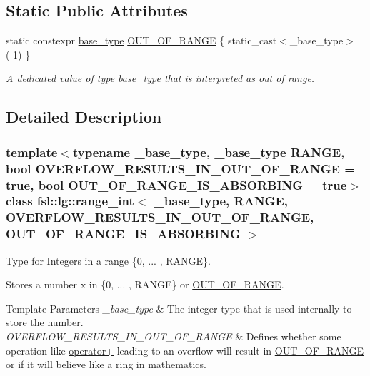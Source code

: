 \subsection*{Static Public Attributes}
\begin{DoxyCompactItemize}
\item 
\mbox{\label{classfsl_1_1lg_1_1range__int_ad2c724f2b6b690d1217d51ef4b712225}} 
static constexpr \mbox{\hyperlink{classfsl_1_1lg_1_1range__int_a901feb77897b3353d554f06d4d6a8f4a}{base\+\_\+type}} \mbox{\hyperlink{classfsl_1_1lg_1_1range__int_ad2c724f2b6b690d1217d51ef4b712225}{O\+U\+T\+\_\+\+O\+F\+\_\+\+R\+A\+N\+GE}} \{ static\+\_\+cast$<$\+\_\+base\+\_\+type$>$(-\/1) \}
\begin{DoxyCompactList}\small\item\em A dedicated value of type \mbox{\hyperlink{classfsl_1_1lg_1_1range__int_a901feb77897b3353d554f06d4d6a8f4a}{base\+\_\+type}} that is interpreted as out of range. \end{DoxyCompactList}\end{DoxyCompactItemize}


\subsection{Detailed Description}
\subsubsection*{template$<$typename \+\_\+base\+\_\+type, \+\_\+base\+\_\+type R\+A\+N\+GE, bool O\+V\+E\+R\+F\+L\+O\+W\+\_\+\+R\+E\+S\+U\+L\+T\+S\+\_\+\+I\+N\+\_\+\+O\+U\+T\+\_\+\+O\+F\+\_\+\+R\+A\+N\+GE = true, bool O\+U\+T\+\_\+\+O\+F\+\_\+\+R\+A\+N\+G\+E\+\_\+\+I\+S\+\_\+\+A\+B\+S\+O\+R\+B\+I\+NG = true$>$\newline
class fsl\+::lg\+::range\+\_\+int$<$ \+\_\+base\+\_\+type, R\+A\+N\+G\+E, O\+V\+E\+R\+F\+L\+O\+W\+\_\+\+R\+E\+S\+U\+L\+T\+S\+\_\+\+I\+N\+\_\+\+O\+U\+T\+\_\+\+O\+F\+\_\+\+R\+A\+N\+G\+E, O\+U\+T\+\_\+\+O\+F\+\_\+\+R\+A\+N\+G\+E\+\_\+\+I\+S\+\_\+\+A\+B\+S\+O\+R\+B\+I\+N\+G $>$}

Type for Integers in a range \{0, ... , R\+A\+N\+GE\}. 

Stores a number x in \{0, ... , R\+A\+N\+GE\} or \mbox{\hyperlink{classfsl_1_1lg_1_1range__int_ad2c724f2b6b690d1217d51ef4b712225}{O\+U\+T\+\_\+\+O\+F\+\_\+\+R\+A\+N\+GE}}. 
\begin{DoxyTemplParams}{Template Parameters}
{\em \+\_\+base\+\_\+type} & The integer type that is used internally to store the number. \\
\hline
{\em O\+V\+E\+R\+F\+L\+O\+W\+\_\+\+R\+E\+S\+U\+L\+T\+S\+\_\+\+I\+N\+\_\+\+O\+U\+T\+\_\+\+O\+F\+\_\+\+R\+A\+N\+GE} & Defines whether some operation like \mbox{\hyperlink{classfsl_1_1lg_1_1range__int_ae36516b64216806a57986fcedaa07d63}{operator+}} leading to an overflow will result in \mbox{\hyperlink{classfsl_1_1lg_1_1range__int_ad2c724f2b6b690d1217d51ef4b712225}{O\+U\+T\+\_\+\+O\+F\+\_\+\+R\+A\+N\+GE}} or if it will believe like a ring in mathematics. \\
\hline
\end{DoxyTemplParams}


